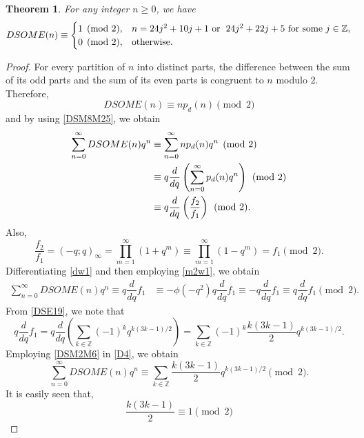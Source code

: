 \documentclass[12pt]{article}
\numberwithin{equation}{section}
\newtheorem{theorem}{Theorem}[section]
\theoremstyle{definition}
\theoremstyle{remark}
\numberwithin{equation}{section}
\begin{document}
\begin{theorem}\label{DSM2THM}
For any integer $n\ge0$, we have
$$DSOME(n)\equiv
\begin{cases}
1\pmod2,
& n=24j^2+10j+1 \text{ or \;$24j^2+22j+5$}\text{ for some }j\in\mathbb Z,\\
0\pmod2,
& \text{otherwise}.
\end{cases}$$
\end{theorem}

\begin{proof}
For every partition of $n$ into distinct parts,  the difference
between the sum of its odd parts and the sum of its even parts is congruent
to $n$ modulo $2$. Therefore,
\begin{equation*}
DSOME(n)\equiv n p_d(n)\pmod{2}
\end{equation*}
and by using \eqref{DSM8M25}, we obtain
\begin{align}
\sum_{n=0}^{\infty}DSOME(n)q^n
&\equiv \sum_{n=0}^{\infty}n p_d(n)q^n\pmod2\notag\\
&\equiv q\dfrac{d}{dq}
  \left(\sum_{n=0}^{\infty}p_d(n)q^n\right)\pmod2\notag\\
&\label{m2w1}\equiv q\dfrac{d}{dq}\left(\dfrac{f_2}{f_1}\right)
\pmod{2}.
\end{align}
Also,
\begin{equation}\label{dw1}
\dfrac{f_2}{f_1}=(-q;q)_\infty
 =\prod_{m=1}^{\infty}(1+q^m)\equiv\prod_{m=1}^{\infty}(1-q^m)
 =f_1
\pmod{2}.
\end{equation}
Differentiating \eqref{dw1} and then employing \eqref{m2w1},
we obtain
\begin{align}
\sum_{n=0}^{\infty}DSOME(n)q^n\equiv q\dfrac{d}{dq}f_1
&\label{D4}\equiv-\phi(-q^2)q\dfrac{d}{dq}f_1
 \equiv-q\dfrac{d}{dq}f_1
 \equiv q\dfrac{d}{dq}f_1
\pmod{2}.
\end{align}
From \eqref{DSE19}, we note that 
\begin{equation}\label{DSM2M6}
q\dfrac{d}{dq} f_1
=
q\dfrac{d}{dq}
\left(
\sum_{k\in\mathbb Z}
(-1)^kq^{k(3k-1)/2}
\right)
=
\sum_{k\in\mathbb Z}
(-1)^k
\dfrac{k(3k-1)}{2}
q^{k(3k-1)/2}.
\end{equation}
Employing \eqref{DSM2M6} in \eqref{D4}, we obtain
\begin{equation}\label{DSM2M7}
\sum_{n=0}^{\infty}DSOME(n)q^n
\equiv
\sum_{k\in\mathbb Z}
\dfrac{k(3k-1)}{2}
q^{k(3k-1)/2}
\pmod2.
\end{equation}
It is easily seen that, 
\begin{equation}\label{DSM2M10}
\dfrac{k(3k-1)}{2}\equiv1\pmod2

\end{equation}
\end{proof}
\end{document}
